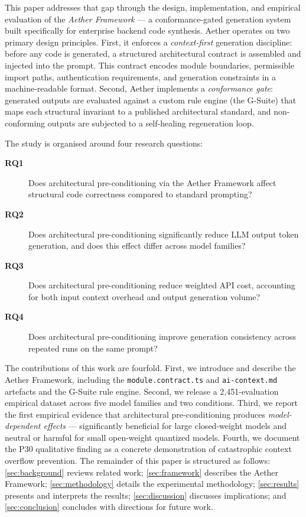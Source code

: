 \documentclass[review,12pt,3p]{elsarticle}
\begin{document}
This paper addresses that gap through the design, implementation, and empirical evaluation
of the \emph{Aether Framework} --- a conformance-gated generation system built specifically
for enterprise backend code synthesis. Aether operates on two primary design principles.
First, it enforces a \emph{context-first} generation discipline: before any code is
generated, a structured architectural contract is assembled and injected into the prompt.
This contract encodes module boundaries, permissible import paths, authentication
requirements, and generation constraints in a machine-readable format. Second, Aether
implements a \emph{conformance gate}: generated outputs are evaluated against a custom
rule engine (the G-Suite) that maps each structural invariant to a published architectural
standard, and non-conforming outputs are subjected to a self-healing regeneration loop.

The study is organised around four research questions:

\begin{description}
  \item[\textbf{RQ1}] Does architectural pre-conditioning via the Aether Framework affect
    structural code correctness compared to standard prompting?
  \item[\textbf{RQ2}] Does architectural pre-conditioning significantly reduce LLM output
    token generation, and does this effect differ across model families?
  \item[\textbf{RQ3}] Does architectural pre-conditioning reduce weighted API cost,
    accounting for both input context overhead and output generation volume?
  \item[\textbf{RQ4}] Does architectural pre-conditioning improve generation consistency
    across repeated runs on the same prompt?
\end{description}

The contributions of this work are fourfold. First, we introduce and describe the Aether
Framework, including the \texttt{module.contract.ts} and \texttt{ai-context.md} artefacts
and the G-Suite rule engine. Second, we release a 2,451-evaluation empirical dataset across
five model families and two conditions. Third, we report the first empirical evidence that
architectural pre-conditioning produces \emph{model-dependent effects} --- significantly
beneficial for large closed-weight models and neutral or harmful for small open-weight
quantized models. Fourth, we document the P30 qualitative finding as a concrete
demonstration of catastrophic context overflow prevention. The remainder of this paper is
structured as follows: \cref{sec:background} reviews related work; \cref{sec:framework}
describes the Aether Framework; \cref{sec:methodology} details the experimental methodology;
\cref{sec:results} presents and interprets the results; \cref{sec:discussion} discusses
implications; and \cref{sec:conclusion} concludes with directions for future work.
\end{document}
